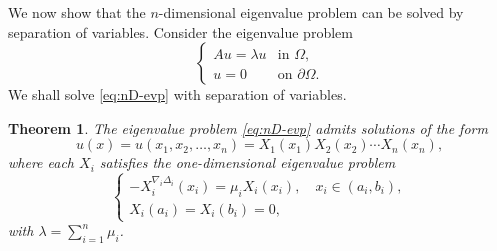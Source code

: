 \documentclass{article}
\newtheorem{theorem}{Theorem}[section]
\numberwithin{equation}{section}
\numberwithin{theorem}{section}
\begin{document}
We now show that the $n$-dimensional eigenvalue problem can be solved by separation of variables. Consider the eigenvalue problem
\begin{equation}\label{eq:nD-evp}
\begin{cases}
Au = \lambda u & \text{in } \Omega,\\
u = 0 & \text{on } \partial\Omega.
\end{cases}
\end{equation}
We shall solve \eqref{eq:nD-evp} with separation of variables.
\begin{theorem}\label{thm:separation}
The eigenvalue problem \eqref{eq:nD-evp} admits solutions of the form
\begin{equation}\label{eq:separated-solution}
u(x) = u(x_1, x_2, \ldots, x_n) = X_1(x_1) X_2(x_2) \cdots X_n(x_n),
\end{equation}
where each $X_i$ satisfies the one-dimensional eigenvalue problem
\begin{equation} \label{eq:1D-separated}
\left\{ \begin{array}{ll}
-X_i^{\nabla_i\Delta_i}(x_i) = \mu_i X_i(x_i), \quad x_i \in (a_i, b_i), \\
X_i(a_i) = X_i(b_i) = 0, 
\end{array}\right.
\end{equation}
with $\lambda = \displaystyle \sum_{i=1}^{n} \mu_i$.
\end{theorem}
\end{document}
